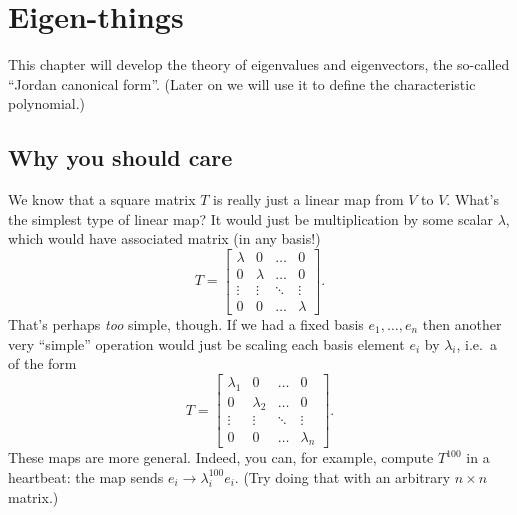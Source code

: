 \chapter{Eigen-things}
\label{ch:eigen_things}
This chapter will develop the theory of eigenvalues and eigenvectors,
the so-called ``Jordan canonical form''.
(Later on we will use it to
define the characteristic polynomial.)

\section{Why you should care}
We know that a square matrix $T$ is really just
a linear map from $V$ to $V$.
What's the simplest type of linear map?
It would just be multiplication by some scalar $\lambda$,
which would have associated matrix (in any basis!)
\[
	T =
	\begin{bmatrix}
		\lambda & 0 & \dots & 0 \\
		0 & \lambda & \dots & 0 \\
		\vdots & \vdots & \ddots & \vdots \\
		0 & 0 & \dots & \lambda
	\end{bmatrix}.
\]
That's perhaps \emph{too} simple, though.
If we had a fixed basis $e_1, \dots, e_n$
then another very ``simple'' operation
would just be scaling each basis element $e_i$ by $\lambda_i$,
i.e.\ a  of the form
\[
	T = \begin{bmatrix}
		\lambda_1 & 0 & \dots & 0 \\
		0 & \lambda_2 & \dots & 0 \\
		\vdots & \vdots & \ddots & \vdots \\
		0 & 0 & \dots & \lambda_n
	\end{bmatrix}.
\]
These maps are more general.
Indeed, you can, for example, compute $T^{100}$ in a heartbeat:
the map sends $e_i \to \lambda_i^{100} e_i$.
(Try doing that with an arbitrary $n \times n$ matrix.)

